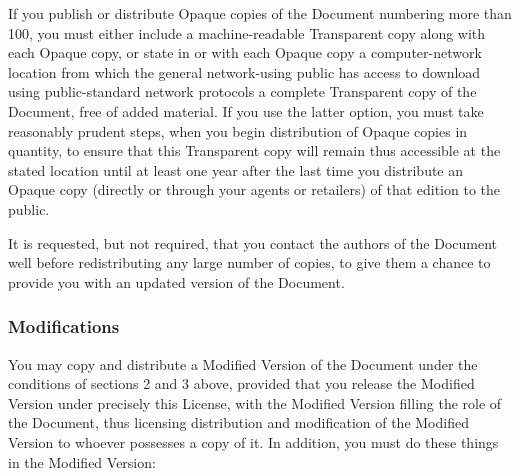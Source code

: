 \documentclass{article}
\begin{document}
If you publish or distribute Opaque copies of the Document numbering
more than 100, you must either include a machine-readable Transparent
copy along with each Opaque copy, or state in or with each Opaque copy
a computer-network location from which the general network-using
public has access to download using public-standard network protocols
a complete Transparent copy of the Document, free of added material.
If you use the latter option, you must take reasonably prudent steps,
when you begin distribution of Opaque copies in quantity, to ensure
that this Transparent copy will remain thus accessible at the stated
location until at least one year after the last time you distribute an
Opaque copy (directly or through your agents or retailers) of that
edition to the public.

It is requested, but not required, that you contact the authors of the
Document well before redistributing any large number of copies, to give
them a chance to provide you with an updated version of the Document.

\subsubsection{Modifications}

You may copy and distribute a Modified Version of the Document under
the conditions of sections 2 and 3 above, provided that you release
the Modified Version under precisely this License, with the Modified
Version filling the role of the Document, thus licensing distribution
and modification of the Modified Version to whoever possesses a copy
of it.  In addition, you must do these things in the Modified Version:
\end{document}
